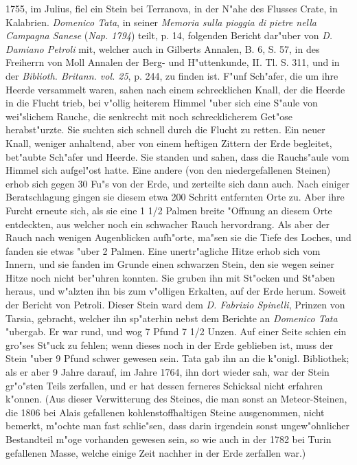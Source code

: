 \documentclass[a4paper, 11pt, oneside, polutonikogreek, german]{article}
\begin{document}
1755, im Julius, fiel ein Stein bei Terranova, in der N"ahe des Flusses Crate, in Kalabrien. \emph{Domenico Tata}, in seiner \emph{Memoria sulla pioggia di pietre nella Campagna Sanese} (\emph{Nap. 1794}) teilt, p. 14, folgenden Bericht dar"uber von \emph{D. Damiano Petroli} mit, welcher auch in Gilberts Annalen, B. 6, S. 57, in des Freiherrn von Moll Annalen der Berg- und H"uttenkunde, II. Tl. S. 311, und in der \emph{Biblioth. Britann. vol. 25}, p. 244, zu finden ist. F"unf Sch"afer, die um ihre Heerde versammelt waren, sahen nach einem schrecklichen Knall, der die Heerde in die Flucht trieb, bei v"ollig heiterem Himmel "uber sich eine S"aule von wei"slichem Rauche, die senkrecht mit noch schrecklicherem Get"ose herabst"urzte. Sie suchten sich schnell durch die Flucht zu retten. Ein neuer Knall, weniger anhaltend, aber von einem heftigen Zittern der Erde begleitet, bet"aubte Sch"afer und Heerde. Sie standen und sahen, dass die Rauchs"aule vom Himmel sich aufgel"ost hatte. Eine andere (von den niedergefallenen Steinen) erhob sich gegen 30 Fu"s von der Erde, und zerteilte sich dann auch. Nach einiger Beratschlagung gingen sie diesem etwa 200 Schritt entfernten Orte zu. Aber ihre Furcht erneute sich, als sie eine 1 1/2 Palmen breite "Offnung an diesem Orte entdeckten, aus welcher noch ein schwacher Rauch hervordrang. Als aber der Rauch nach wenigen Augenblicken aufh"orte, ma"sen sie die Tiefe des Loches, und fanden sie etwas "uber 2 Palmen. Eine unertr"agliche Hitze erhob sich vom Innern, und sie fanden im Grunde einen schwarzen Stein, den sie wegen seiner Hitze noch nicht ber"uhren konnten. Sie gruben ihn mit St"ocken und St"aben heraus, und w"alzten ihn bis zum v"olligen Erkalten, auf der Erde herum. Soweit der Bericht von Petroli. Dieser Stein ward dem \emph{D. Fabrizio Spinelli}, Prinzen von Tarsia, gebracht, welcher ihn sp"aterhin nebst dem Berichte an \emph{Domenico Tata} "ubergab. Er war rund, und wog 7 Pfund 7 1/2 Unzen. Auf einer Seite schien ein gro"ses St"uck zu fehlen; wenn dieses noch in der Erde geblieben ist, muss der Stein "uber 9 Pfund schwer gewesen sein. Tata gab ihn an die k"onigl. Bibliothek; als er aber 9 Jahre darauf, im Jahre 1764, ihn dort wieder sah, war der Stein gr"o"sten Teils zerfallen, und er hat dessen ferneres Schicksal nicht erfahren k"onnen. (Aus dieser Verwitterung des Steines, die man sonst an Meteor-Steinen, die 1806 bei Alais gefallenen kohlenstoffhaltigen Steine ausgenommen, nicht bemerkt, m"ochte man fast schlie"sen, dass darin irgendein sonst ungew"ohnlicher Bestandteil m"oge vorhanden gewesen sein, so wie auch in der 1782 bei Turin gefallenen Masse, welche einige Zeit nachher in der Erde zerfallen war.)
\end{document}

